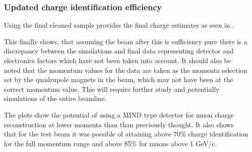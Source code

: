

\clearpage
\subsubsection{Updated charge identification efficiency}

Using the final cleaned sample provides the final charge estimates as seen in .

This finally shows, that assuming the beam after this is sufficiency pure there is a discrepancy between the simulations and final data representing detector and electronics factors which have not been taken into account. It should also be noted that the momentum values for the data are taken as the momenta selection set by the quadrupole magnets in the beam, which may not have been at the correct momentum value. This will require further study and potentially simulations of the entire beamline.

The plots show the potential of using a MIND type detector for muon charge reconstruction at lower momenta than than previously thought. It also shows that for the test beam it was possible of attaining above 70\% charge identification for the full momentum range and above 85\% for muons above 1 GeV/c. %

